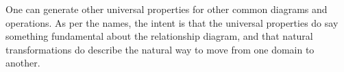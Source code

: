 \documentclass[11pt]{article}
\begin{document}
One can generate other universal properties for other common diagrams and operations.
As per the names, the intent is that the universal properties do say something fundamental
about the relationship diagram, and that natural transformations do describe the
natural way to move from one domain to another.

\nocite{awodey:category}
\nocite{riehl:category}


\end{document}
